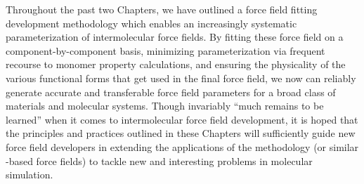 Throughout the past two Chapters, we have outlined a force field fitting
development methodology which enables an increasingly systematic
parameterization of intermolecular force fields.  By fitting these force field
on a component-by-component basis, minimizing parameterization via frequent
recourse to monomer property calculations, and ensuring the physicality of the
various functional forms that get used in the final force field, we now can
reliably generate accurate and transferable force field parameters for a broad
class of materials and molecular systems. Though invariably ``much remains to
be learned'' when it comes to intermolecular force field development, it is
hoped that the principles and practices outlined in these Chapters will
sufficiently guide new force field developers in extending the applications of
the \mastiff methodology (or similar \eda-based force fields) to tackle new
and interesting problems in molecular simulation.
